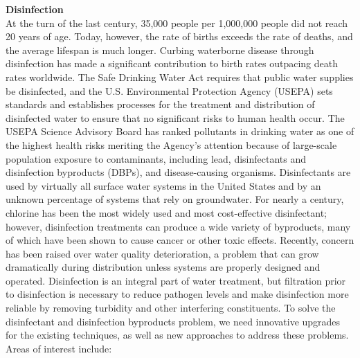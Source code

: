 \textbf{Disinfection}\\
At the turn of the last century, 35,000 people per 1,000,000 people did not reach 20 years of age. Today, however, the rate of births exceeds the rate of deaths, and the average lifespan is much longer. Curbing waterborne disease through disinfection
has made a significant contribution to birth rates outpacing death rates worldwide. The Safe Drinking Water Act requires that public water supplies be disinfected, and the U.S. Environmental Protection Agency (USEPA) sets standards and establishes processes for the treatment and distribution of disinfected water to ensure that no significant risks to human health occur. The USEPA Science Advisory Board has ranked pollutants in drinking water as one of the highest health risks meriting the Agency’s attention because of large-scale population exposure to contaminants, including lead, disinfectants and disinfection byproducts (DBPs), and disease-causing organisms.
Disinfectants are used by virtually all surface water systems in the United States and by an unknown percentage of systems that rely on groundwater. For nearly a century, chlorine has been the most widely used and most cost-effective disinfectant; however, disinfection treatments can produce a wide variety of byproducts, many of which have been shown to cause cancer or other toxic effects. Recently, concern has been raised over water quality deterioration, a problem that can grow dramatically during distribution unless systems are properly designed and operated. Disinfection is an integral part of water treatment, but filtration prior to disinfection is necessary to reduce pathogen levels and make disinfection more reliable by removing turbidity and other interfering constituents.
To solve the disinfectant and disinfection byproducts problem, we need innovative upgrades for the existing techniques, as well as new approaches to address these problems. Areas of interest include:\\
